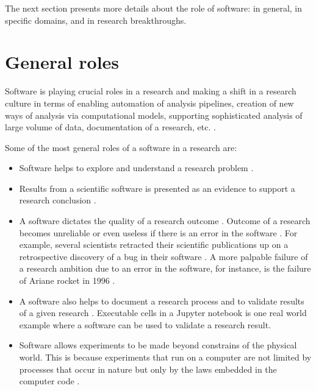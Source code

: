 The next section presents more details about the role of software: in general, in specific domains, and in research breakthroughs.

\section{General roles}
\label{subsec:background:first_section:first_subsection}

Software is playing crucial roles in a research and making a shift in a research culture in terms of  enabling automation of analysis pipelines, creation of new ways of analysis via computational models, supporting sophisticated analysis of large volume of data, documentation of a research, etc. \citep{ jay2020software}. 

Some of the most general roles of a software in a research are:

\begin{itemize}%

	\item Software helps to explore and understand a research problem \citep{hannay2009scientists}.
	\item Results from a scientific software is presented as an evidence to support a research conclusion \citep{kanewala2014testing}. 
	
	\item A software dictates the quality of a research outcome \citep{hannay2009scientists}. Outcome of a research becomes unreliable or even useless if there is an error in the software \citep{soergel2014rampant}. For example, several scientists retracted their scientific publications up on a retrospective discovery of a bug in their software \citep{wilson2014best,merali2010computational,miller2006scientist}. A more palpable failure of a research ambition due to an error in the software, for instance, is the failure of Ariane rocket in 1996 \citep{enwiki:1054482061}.    
	
	\item A software also helps to document a research process and to validate results of a given research \citep{jay2020software}. Executable cells in a Jupyter notebook is one real world example where a software can be used to validate a research result.
	
	\item Software allows experiments to be made beyond constrains of the physical world. This is because experiments that run on a computer are not limited by processes that occur in nature but only by the laws embedded in the computer code \citep{wolfram1984computer}. 

\end{itemize}


